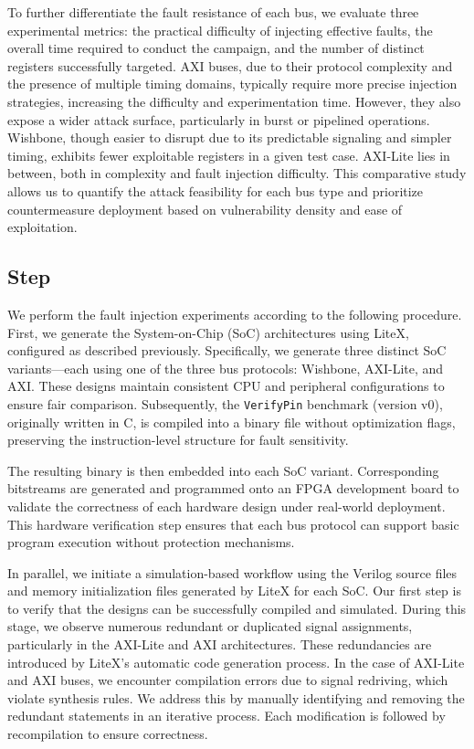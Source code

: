 To further differentiate the fault resistance of each bus, we evaluate three experimental metrics: the practical difficulty of injecting effective faults, the overall time required to conduct the campaign, and the number of distinct registers successfully targeted. AXI buses, due to their protocol complexity and the presence of multiple timing domains, typically require more precise injection strategies, increasing the difficulty and experimentation time. However, they also expose a wider attack surface, particularly in burst or pipelined operations. Wishbone, though easier to disrupt due to its predictable signaling and simpler timing, exhibits fewer exploitable registers in a given test case. AXI-Lite lies in between, both in complexity and fault injection difficulty. This comparative study allows us to quantify the attack feasibility for each bus type and prioritize countermeasure deployment based on vulnerability density and ease of exploitation.

\subsection{Step}

We perform the fault injection experiments according to the following procedure. First, we generate the System-on-Chip (SoC) architectures using LiteX, configured as described previously. Specifically, we generate three distinct SoC variants—each using one of the three bus protocols: Wishbone, AXI-Lite, and AXI. These designs maintain consistent CPU and peripheral configurations to ensure fair comparison. Subsequently, the \texttt{VerifyPin} benchmark (version v0), originally written in C, is compiled into a binary file without optimization flags, preserving the instruction-level structure for fault sensitivity.

The resulting binary is then embedded into each SoC variant. Corresponding bitstreams are generated and programmed onto an FPGA development board to validate the correctness of each hardware design under real-world deployment. This hardware verification step ensures that each bus protocol can support basic program execution without protection mechanisms.

In parallel, we initiate a simulation-based workflow using the Verilog source files and memory initialization files generated by LiteX for each SoC. Our first step is to verify that the designs can be successfully compiled and simulated. During this stage, we observe numerous redundant or duplicated signal assignments, particularly in the AXI-Lite and AXI architectures. These redundancies are introduced by LiteX’s automatic code generation process. In the case of AXI-Lite and AXI buses, we encounter compilation errors due to signal redriving, which violate synthesis rules. We address this by manually identifying and removing the redundant statements in an iterative process. Each modification is followed by recompilation to ensure correctness.


